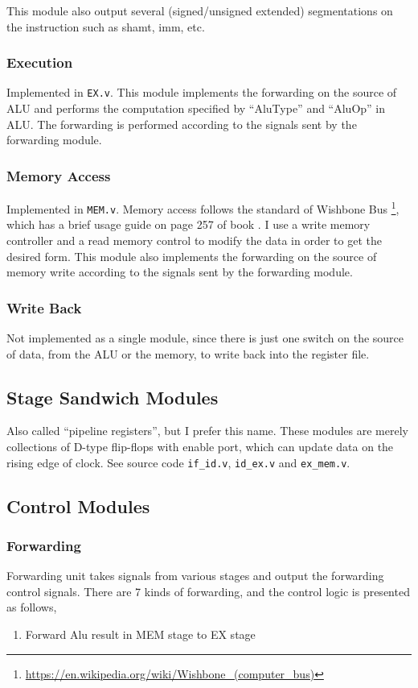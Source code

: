 \documentclass[paper=a4, fontsize=11pt]{scrartcl} %
\numberwithin{equation}{section} %
\numberwithin{figure}{section} %
\numberwithin{table}{section} %
\begin{document}
\begin{spacing}{1.5}
			This module also output several (signed/unsigned extended) segmentations on the instruction such as shamt, imm, etc.
    	\subsubsection{Execution} Implemented in \verb|EX.v|. This module implements the forwarding on the source of ALU and performs the computation specified by ``AluType'' and ``AluOp'' in ALU. The forwarding is performed according to the signals sent by the forwarding module.
    	\subsubsection{Memory Access} Implemented in \verb|MEM.v|. Memory access follows the standard of Wishbone Bus  \footnote{\url{https://en.wikipedia.org/wiki/Wishbone_(computer_bus)}}, which has a brief usage guide on page 257 of book \cite{lsl}. I use a write memory controller and a read memory control to modify the data in order to get the desired form. This module also implements the forwarding on the source of memory write according to the signals sent by the forwarding module.
    	
    	\subsubsection{Write Back} Not implemented as a single module, since there is just one switch on the source of data, from the ALU or the memory, to write back into the register file.

    \subsection{Stage Sandwich Modules}
    	Also called ``pipeline registers'', but I prefer this name. These modules are merely collections of D-type flip-flops with enable port, which can update data on the rising edge of clock. See source code \verb|if_id.v|, \verb|id_ex.v| and \verb|ex_mem.v|.
    \subsection{Control Modules}
    	\subsubsection{Forwarding}
	    	 Forwarding unit takes signals from various stages and output the forwarding control signals. There are 7 kinds of forwarding, and the control logic is presented as follows,
	    	 \begin{enumerate}
	    	 	\item Forward Alu result in MEM stage to EX stage
	    	 	

\end{enumerate}
\end{spacing}
\end{document}
